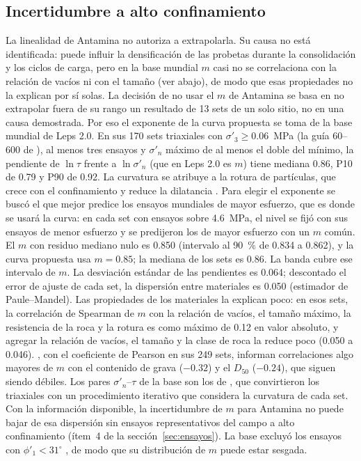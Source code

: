 \documentclass[11pt,letterpaper]{article}
\begin{document}
\subsection{Incertidumbre a alto confinamiento}\label{sec:alto}
La linealidad de Antamina no autoriza a extrapolarla. Su causa no está identificada: puede influir la densificación de las probetas durante la consolidación y los ciclos de carga, pero en la base mundial $m$ casi no se correlaciona con la relación de vacíos ni con el tamaño (ver abajo), de modo que esas propiedades no la explican por sí solas. La decisión de no usar el $m$ de Antamina se basa en no extrapolar fuera de su rango un resultado de 13 sets de un solo sitio, no en una causa demostrada. Por eso el exponente de la curva propuesta se toma de la base mundial de Leps 2.0. En sus 170 sets triaxiales con $\sigma'_3 \ge 0.06$~MPa (la guía 60--600 de \citealp[p.~11]{cylwik}), al menos tres ensayos y $\sigma'_n$ máximo de al menos el doble del mínimo, la pendiente de $\ln\tau$ frente a $\ln\sigma'_n$ (que en Leps 2.0 es $m$) tiene mediana 0.86, P10 de 0.79 y P90 de 0.92. La curvatura se atribuye a la rotura de partículas, que crece con el confinamiento y reduce la dilatancia \citep{marsal1967,indraratna1993}. Para elegir el exponente se buscó el que mejor predice los ensayos mundiales de mayor esfuerzo, que es donde se usará la curva: en cada set con ensayos sobre 4.6~MPa, el nivel se fijó con sus ensayos de menor esfuerzo y se predijeron los de mayor esfuerzo con un $m$ común. El $m$ con residuo mediano nulo es 0.850 (intervalo al 90~\% de 0.834 a 0.862), y la curva propuesta usa $m = 0.85$; la mediana de los sets es 0.86. La banda cubre ese intervalo de $m$. La desviación estándar de las pendientes es 0.064; descontado el error de ajuste de cada set, la dispersión entre materiales es 0.050 (estimador de Paule--Mandel). Las propiedades de los materiales la explican poco: en esos sets, la correlación de Spearman de $m$ con la relación de vacíos, el tamaño máximo, la resistencia de la roca y la rotura es como máximo de 0.12 en valor absoluto, y agregar la relación de vacíos, el tamaño y la clase de roca la reduce poco (0.050 a 0.046). \citet[Tabla~4]{cylwik}, con el coeficiente de Pearson en sus 249 sets, informan correlaciones algo mayores de $m$ con el contenido de grava ($-0.32$) y el $D_{50}$ ($-0.24$), que siguen siendo débiles. Los pares $\sigma'_n$--$\tau$ de la base son los de \citet{cylwik}, que convirtieron los triaxiales con un procedimiento iterativo que considera la curvatura de cada set. Con la información disponible, la incertidumbre de $m$ para Antamina no puede bajar de esa dispersión sin ensayos representativos del campo a alto confinamiento (ítem~4 de la sección~\ref{sec:ensayos}). La base excluyó los ensayos con $\phi'_1 < 31^{\circ}$ \citep[p.~4]{cylwik}, de modo que su distribución de $m$ puede estar sesgada.
\end{document}

